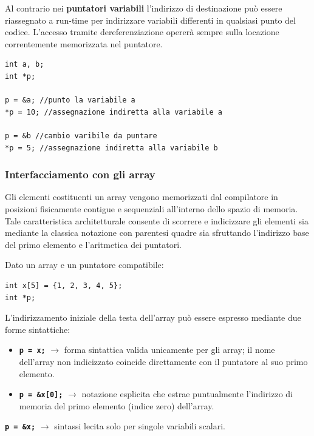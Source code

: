Al contrario nei \textbf{puntatori variabili} l'indirizzo di destinazione può essere riassegnato a run-time per indirizzare variabili differenti in qualsiasi punto del codice. L'accesso tramite dereferenziazione opererà sempre sulla locazione correntemente memorizzata nel puntatore.
\begin{verbatim}
int a, b;
int *p;

p = &a; //punto la variabile a
*p = 10; //assegnazione indiretta alla variabile a

p = &b //cambio varibile da puntare
*p = 5; //assegnazione indiretta alla variabile b
\end{verbatim}

\subsubsection{Interfacciamento con gli array}
Gli elementi costituenti un array vengono memorizzati dal compilatore in posizioni fisicamente contigue e sequenziali all'interno dello spazio di memoria. Tale caratteristica architetturale consente di scorrere e indicizzare gli elementi sia mediante la classica notazione con parentesi quadre sia sfruttando l'indirizzo base del primo elemento e l'aritmetica dei puntatori.

Dato un array e un puntatore compatibile:
\begin{verbatim}
int x[5] = {1, 2, 3, 4, 5};
int *p;
\end{verbatim}

L'indirizzamento iniziale della testa dell'array può essere espresso mediante due forme sintattiche:
\begin{itemize}
	\item \textbf{\texttt{p = x;}} $\rightarrow$ forma sintattica valida unicamente per gli array; il nome dell'array non indicizzato coincide direttamente con il puntatore al suo primo elemento.
	\item \textbf{\texttt{p = \&x[0];}} $\rightarrow$ notazione esplicita che estrae puntualmente l'indirizzo di memoria del primo elemento (indice zero) dell'array.
\end{itemize}
\textbf{\texttt{p = \&x;}} $\rightarrow$ sintassi lecita solo per singole variabili scalari.

